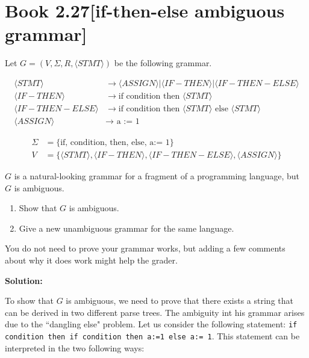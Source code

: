 \documentclass[11pt]{article}
\newenvironment{question}[2]
{\newpage\section{#1\texorpdfstring{\hfill}{horizontal spacing}{\rm\normalsize #2}}}{}
\newenvironment{solution}
{\textbf{Solution: }\color{blue}}
{\color{black}}
\begin{document}

\begin{question}{Book 2.27}{[if-then-else ambiguous grammar]}

Let \(G = (V, \Sigma, R, \langle STMT \rangle)\) be the following grammar.

\begin{equation*}
    \begin{split}
        \langle STMT \rangle &\rightarrow \langle ASSIGN \rangle | \langle IF-THEN \rangle | \langle IF-THEN-ELSE \rangle \\
        \langle IF-THEN \rangle &\rightarrow \text{if condition then } \langle STMT \rangle \\
        \langle IF-THEN-ELSE \rangle &\rightarrow \text{if condition then } \langle STMT \rangle \text{ else } \langle STMT \rangle \\
        \langle ASSIGN \rangle &\rightarrow \text{ a := 1 }
    \end{split}
\end{equation*}

\begin{equation*}
    \begin{split}
        \Sigma &= \{ \text{if, condition, then, else, a:= 1} \} \\
        V &= \{ \langle STMT \rangle, \langle IF-THEN \rangle, \langle IF-THEN-ELSE \rangle, \langle ASSIGN \rangle \}
    \end{split}
\end{equation*}

\(G\) is a natural-looking grammar for a fragment of a programming language, but \(G\) is ambiguous.
\begin{enumerate}
    \item Show that \(G\) is ambiguous.
    \item Give a new unambiguous grammar for the same language.
\end{enumerate}

You do not need to prove your grammar works, but adding a few comments about why it does work might help the grader.

\begin{solution}

To show that \(G\) is ambiguous, we need to prove that there exists a string that can be derived in two different parse trees. The ambiguity int his grammar arises due to the ``dangling else" problem. Let us consider the following statement: \verb|if condition then if condition then a:=1 else a:= 1|. This statement can be interpreted in the two following ways:


\end{solution}
\end{question}
\end{document}
